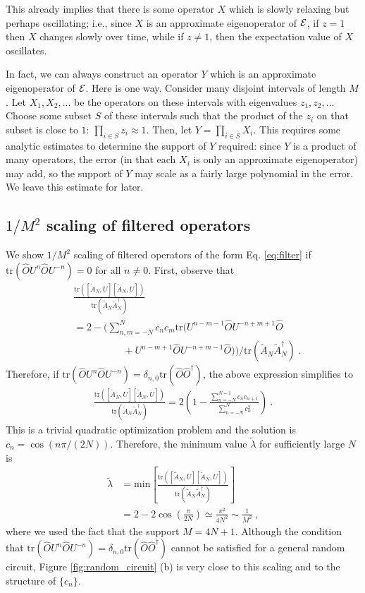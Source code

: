 \documentclass[twocolumn,superscriptaddress, prb]{revtex4-1}
\begin{document}
This already implies that there is some operator $X$ which is slowly relaxing but perhaps oscillating; i.e., since $X$ is an approximate eigenoperator of ${\cal E}$, if $z=1$ then $X$ changes slowly over time, while if $z \neq 1$, then the expectation value of $X$ oscillates.

In fact, we can always construct an operator $Y$ which is an approximate eigenoperator of ${\cal E}$.  Here is one way.  Consider many disjoint intervals of length $M$.  Let $X_1,X_2,...$ be the operators on these intervals with eigenvalues $z_1,z_2,...$  Choose some subset $S$ of these intervals such that the product of the $z_i$ on that subset is close to $1$: $\prod_{i \in S} z_i \approx 1$.  Then, let $Y=\prod_{i \in S} X_i$.  This requires some analytic estimates to determine the support of $Y$ required: since $Y$ is a product of many operators, the error (in that each $X_i$ is only an approximate eigenoperator) may add, so the support of $Y$ may scale as a fairly large polynomial in the error.  We leave this estimate for later.

\subsection{$1/M^2$ scaling of filtered operators}
We show $1/M^2$ scaling of filtered operators of the form Eq. \eqref{eq:filter} if $\mathrm{tr}(\hat{O}U^n \hat{O}U^{-n}) = 0$ for all $n\neq 0$.
First, observe that
\begin{align}
& \frac{\mathrm{tr}([\tilde{A}_N,U][\tilde{A}_N,U])}{\mathrm{tr}(\tilde{A}_N\tilde{A}_N^\dag)} \nonumber\\
&=2 - \bigg(\sum_{n,m = -N}^{N}c_n c_m \mathrm{tr}(U^{n-m-1}\hat{O}U^{-n+m+1}\hat{O} \nonumber\\
&\quad\quad\quad\quad\quad + U^{n-m+1}\hat{O}U^{-n+m-1}\hat{O})\bigg)/\mathrm{tr}(\tilde{A}_N\tilde{A}_N^\dag) ~.
\end{align}
Therefore, if $\mathrm{tr}(\hat{O}U^n \hat{O}U^{-n}) = \delta_{n,0}\mathrm{tr}(\hat{O}\hat{O}^\dag)$,
the above expression simplifies to
\begin{align}
\frac{\mathrm{tr}([\tilde{A}_N,U][\tilde{A}_N,U])}{\mathrm{tr}(\tilde{A}_N\tilde{A}_N^\dag)}=2\left(1 - \frac{\sum_{n=-N}^{N-1}c_n c_{n+1}}{\sum_{n=-N}^N c_n^2}\right) ~.
\end{align}
This is a trivial quadratic optimization problem and the solution is $c_n = \cos(n\pi/(2N))$.
Therefore, the minimum value $\tilde{\lambda}$ for sufficiently large $N$ is
\begin{align}
\tilde{\lambda} &= \mathrm{min}\left[\frac{\mathrm{tr}([\tilde{A}_N,U][\tilde{A}_N,U])}{\mathrm{tr}(\tilde{A}_N\tilde{A}_N^\dag)} \right] \nonumber\\
&= 2 - 2\cos\left(\frac{\pi}{2N}\right) \simeq \frac{\pi^2}{4N^2} \sim \frac{1}{M^2} ~,
\end{align}
where we used the fact that the support $M = 4N +1 $.
Although the condition that $\mathrm{tr}(\hat{O}U^n \hat{O}U^{-n}) = \delta_{n,0}\mathrm{tr}(\hat{O}\hat{O}^\dag)$
cannot be satisfied for a general random circuit, Figure \ref{fig:random_circuit} (b) is very close to this scaling and to the structure of $\{c_n\}$.
\end{document}
